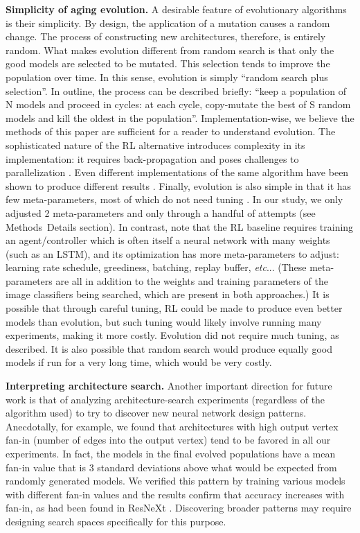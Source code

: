 \documentclass[letterpaper]{article} \usepackage{aaai19}  \usepackage{times}  \usepackage{helvet}  \usepackage{courier}  \usepackage{graphicx}  \frenchspacing
\makeatletter
\DeclareRobustCommand\onedot{\futurelet\@let@token\@onedot}
\def\@onedot{\ifx\@let@token.\else.\null\fi\xspace}
\def\etc{\emph{etc}\onedot}
\makeatother
\begin{document}
\textbf{Simplicity of aging evolution.} A desirable feature of evolutionary algorithms is their simplicity. By design, the application of a mutation causes a random change. The process of constructing new architectures, therefore, is entirely random. What makes evolution different from random search is that only the good models are selected to be mutated. This selection tends to improve the population over time. In this sense, evolution is simply ``random search plus selection''. In outline, the process can be described briefly: ``keep a population of N models and proceed in cycles: at each cycle, copy-mutate the best of S random models and kill the oldest in the population''. Implementation-wise, we believe the methods of this paper are sufficient for a reader to understand evolution. The sophisticated nature of the RL alternative introduces complexity in its implementation: it requires back-propagation and poses challenges to parallelization \cite{salimans2017evolution}. Even different implementations of the same algorithm have been shown to produce different results \cite{henderson2017deep}. Finally, evolution is also simple in that it has few meta-parameters, most of which do not need tuning \cite{real2017large}. In our study, we only adjusted 2 meta-parameters and only through a handful of attempts (see Methods~Details section). In contrast, note that the RL baseline requires training an agent/controller which is often itself a neural network with many weights (such as an LSTM), and its optimization has more meta-parameters to adjust: learning rate schedule, greediness, batching, replay buffer, \etc. (These meta-parameters are all in addition to the weights and training parameters of the image classifiers being searched, which are present in both approaches.) It is possible that through careful tuning, RL could be made to produce even better models than evolution, but such tuning would likely involve running many experiments, making it more costly. Evolution did not require much tuning, as described. It is also possible that random search would produce equally good models if run for a very long time, which would be very costly.

\textbf{Interpreting architecture search.} Another important direction for future work is that of analyzing architecture-search experiments (regardless of the algorithm used) to try to discover new neural network design patterns. Anecdotally, for example, we found that architectures with high output vertex fan-in (number of edges into the output vertex) tend to be favored in all our experiments. In fact, the models in the final evolved populations have a mean fan-in value that is 3 standard deviations above what would be expected from randomly generated models. We verified this pattern by training various models with different fan-in values and the results confirm that accuracy increases with fan-in, as had been found in ResNeXt \cite{xie2017aggregated}. Discovering broader patterns may require designing search spaces specifically for this purpose.
\end{document}
